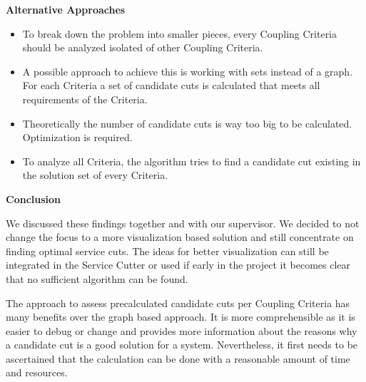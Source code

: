 \textbf{Alternative Approaches}

\begin{itemize}
	\item To break down the problem into smaller pieces, every Coupling Criteria should be analyzed isolated of other Coupling Criteria. 
	\item A possible approach to achieve this is working with sets instead of a graph. For each Criteria a set of candidate cuts is calculated that meets all requirements of the Criteria. 
	\item Theoretically the number of candidate cuts is way too big to be calculated. Optimization is required.
	\item To analyze all Criteria, the algorithm tries to find a candidate cut existing in the solution set of every Criteria. 
\end{itemize}

\textbf{Conclusion}

We discussed these findings together and with our supervisor. We decided to not change the focus to a more visualization based solution and still concentrate on finding optimal service cuts. The ideas for better visualization can still be integrated in the Service Cutter or used if early in the project it becomes clear that no sufficient algorithm can be found. 

The approach to assess precalculated candidate cuts per Coupling Criteria has many benefits over the graph based approach. It is more comprehensible as it is easier to debug or change and provides more information about the reasons why a candidate cut is a good solution for a system. Nevertheless, it first needs to be ascertained that the calculation can be done with a reasonable amount of time and resources. 